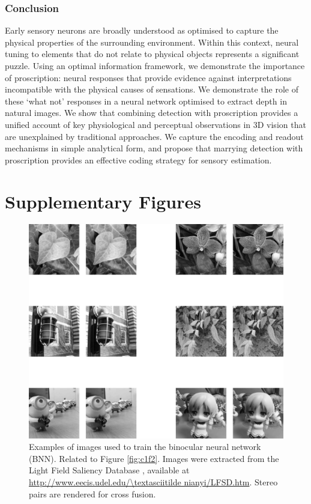 \subsubsection*{Conclusion}

Early sensory neurons are broadly understood as optimised to capture the physical properties of the surrounding environment. Within this context, neural tuning to elements that do not relate to physical objects represents a significant puzzle. Using an optimal information framework, we demonstrate the importance of proscription: neural responses that provide evidence against interpretations incompatible with the physical causes of sensations. We demonstrate the role of these `what not' responses in a neural network optimised to extract depth in natural images. We show that combining detection with proscription provides a unified account of key physiological and perceptual observations in 3D vision that are unexplained by traditional approaches. We capture the encoding and readout mechanisms in simple analytical form, and propose that marrying detection with proscription provides an effective coding strategy for sensory estimation.

\clearpage
\section{Supplementary Figures}

\begin{figure}[!h]
  \centering
  \includegraphics{FigS1.png}
  \caption[Exemplars used to train the binocular neural network.]{Examples of images used to train the binocular neural network (BNN). Related to Figure \ref{fig:c1f2}. Images were extracted from the Light Field Saliency Database \cite{Li:2014ik}, available at \url{http://www.eecis.udel.edu/\textasciitilde nianyi/LFSD.htm}. Stereo pairs are rendered for cross fusion.}
  \label{fig:c1fs1}
\end{figure}

